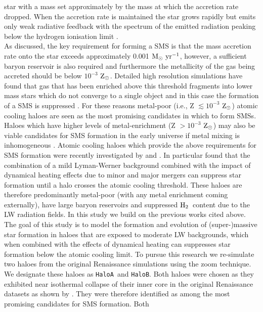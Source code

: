 \documentclass[twocolumn,iop,revtex4]{openjournal}
\newcommand{\msolaryrc} {$\rm{M_{\odot}~yr^{-1}}$}
\newcommand{\zsolarc} {$\rm{Z_{\odot}}$}
\newcommand{\molH} {$\rm{H_2}$~}
\newcommand{\ha} {\texttt{HaloA~}}
\newcommand{\hbc} {\texttt{HaloB}}
\begin{document}
star with a mass set approximately by the mass at which the accretion rate dropped.
When the accretion rate is maintained the star grows rapidly but emits
only weak radiative feedback with the spectrum of the emitted radiation peaking below
the hydrogen ionisation limit \citep{Woods_2018}. \\
\indent As discussed, the key requirement for
forming a SMS is that the mass accretion rate onto the star exceeds approximately 0.001 \msolaryrc,
however, a sufficient baryon reservoir is also required and furthermore the metallicity of the gas
being accreted should be below $10^{-3}$ \zsolarc.  Detailed high resolution simulations have found that gas that has been enriched above this threshold fragments into lower mass stars which do not converge to a single object and in this case the formation of a SMS is suppressed \citep[e.g.][]{Chon_2020}. For these reasons
metal-poor (i.e., Z $\lesssim 10^{-3}$ \zsolarc) atomic cooling haloes are seen as the most 
promising candidates in which to form SMSs. Haloes which have higher levels of 
metal-enrichment (Z $> 10^{-3}$ \zsolarc) may also be viable candidates for 
SMS formation in the early universe if metal mixing is inhomogeneous \citep{Regan_2020a}. Atomic cooling
haloes which provide the above requirements for SMS formation were recently investigated by \cite{Wise_2019}
and \cite{Regan_2020}. In particular \cite{Wise_2019} found that the combination 
of a mild Lyman-Werner background combined with the impact of dynamical heating effects due to
minor and major mergers can suppress star formation until a halo crosses the atomic cooling threshold.
These haloes are therefore predominantly metal-poor (with any metal enrichment coming externally), have large 
baryon reservoirs and suppressed \molH content due to the LW radiation fields. 
In this study we build on the previous works cited above. \\
\indent The goal of this study is to model the formation and evolution of (super-)massive star
formation in haloes that are exposed to moderate LW backgrounds, which when combined with
the effects of dynamical heating can suppresses star formation below the atomic cooling limit.
  To pursue this research we re-simulate
  two haloes from the original Renaissance simulations using the zoom technique.
  We designate
  these haloes as \ha and \hbc. Both haloes were chosen as they exhibited near isothermal
  collapse of their inner core in the original Renaissance datasets as shown by \cite{Regan_2020}.
  They were therefore identified as among the most promising candidates for SMS formation. Both
\end{document}
